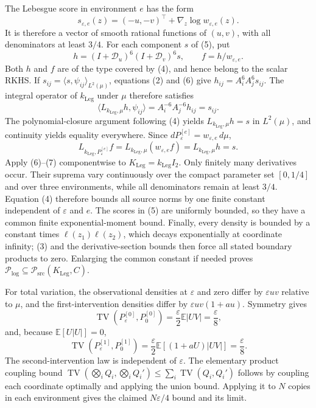 The Lebesgue score in environment \(e\) has the form
\[
 s_{\varepsilon,e}(z)=(-u,-v)^{\top}+\nabla_z\log w_{\varepsilon,e}(z).
 \tag{5}
\]
It is therefore a vector of smooth rational functions of \((u,v)\), with all denominators at least \(3/4\).  For each component \(s\) of (5), put
\[
 h=(I+\mathscr D_u)^6(I+\mathscr D_v)^6s,
 \qquad
 f=h/w_{\varepsilon,e}.
 \tag{6}
\]
Both \(h\) and \(f\) are of the type covered by (4), and hence belong to the scalar RKHS.  If \(s_{ij}=\langle s,\psi_{ij}\rangle_{L^2(\mu)}\), equations (2) and (6) give \(h_{ij}=A_i^6A_j^6s_{ij}\).  The integral operator of \(k_{\mathrm{Leg}}\) under \(\mu\) therefore satisfies
\[
 \langle L_{k_{\mathrm{Leg}},\mu}h,\psi_{ij}\rangle
 =A_i^{-6}A_j^{-6}h_{ij}=s_{ij}.
\]
The polynomial-closure argument following (4) yields \(L_{k_{\mathrm{Leg}},\mu}h=s\) in \(L^2(\mu)\), and continuity yields equality everywhere.  Since \(dP_{\varepsilon}^{[e]}=w_{\varepsilon,e}\,d\mu\),
\[
 L_{k_{\mathrm{Leg}},P_{\varepsilon}^{[e]}}f
 =L_{k_{\mathrm{Leg}},\mu}(w_{\varepsilon,e}f)
 =L_{k_{\mathrm{Leg}},\mu}h=s.
 \tag{7}
\]
Apply (6)--(7) componentwise to \(K_{\mathrm{Leg}}=k_{\mathrm{Leg}}I_2\).  Only finitely many derivatives occur.  Their suprema vary continuously over the compact parameter set \([0,1/4]\) and over three environments, while all denominators remain at least \(3/4\).  Equation (4) therefore bounds all source norms by one finite constant independent of \(\varepsilon\) and \(e\).  The scores in (5) are uniformly bounded, so they have a common finite exponential-moment bound.  Finally, every density is bounded by a constant times \(\ell(z_1)\ell(z_2)\), which decays exponentially at coordinate infinity; (3) and the derivative-section bounds then force all stated boundary products to zero.  Enlarging the common constant if needed proves
\(
\mathcal P_{\mathrm{log}}\subseteq\mathcal P_{\mathrm{src}}(K_{\mathrm{Leg}},C)
\).

For total variation, the observational densities at \(\varepsilon\) and zero differ by \(\varepsilon uv\) relative to \(\mu\), and the first-intervention densities differ by \(\varepsilon uv(1+au)\).  Symmetry gives
\[
 \operatorname{TV}(P_{\varepsilon}^{[0]},P_0^{[0]})
 =\frac{\varepsilon}{2}\mathbb E|UV|=\frac{\varepsilon}{8},
\]
and, because \(\mathbb E[U|U|]=0\),
\[
 \operatorname{TV}(P_{\varepsilon}^{[1]},P_0^{[1]})
 =\frac{\varepsilon}{2}\mathbb E[(1+aU)|UV|]
 =\frac{\varepsilon}{8}.
\]
The second-intervention law is independent of \(\varepsilon\).  The elementary product coupling bound
\(
\operatorname{TV}(\bigotimes_iQ_i,\bigotimes_iQ_i')
\le\sum_i\operatorname{TV}(Q_i,Q_i')
\)
follows by coupling each coordinate optimally and applying the union bound.  Applying it to \(N\) copies in each environment gives the claimed \(N\varepsilon/4\) bound and its limit.


